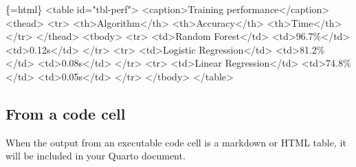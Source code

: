 \documentclass[
  letterpaper,
  DIV=11,
  numbers=noendperiod,
  oneside]{scrreprt}
\newenvironment{Shaded}{\begin{snugshade}}{\end{snugshade}}
\newcommand{\InformationTok}[1]{\textcolor[rgb]{0.37,0.37,0.37}{#1}}
\begin{document}
\begin{tcolorbox}
\begin{Shaded}
\begin{Highlighting}[]
\InformationTok{\textasciigrave{}\textasciigrave{}\textasciigrave{}\{=html\}}
\InformationTok{\textless{}table id="tbl{-}perf"\textgreater{}}
\InformationTok{  \textless{}caption\textgreater{}Training performance\textless{}/caption\textgreater{}}
\InformationTok{  \textless{}thead\textgreater{}}
\InformationTok{    \textless{}tr\textgreater{}}
\InformationTok{      \textless{}th\textgreater{}Algorithm\textless{}/th\textgreater{}}
\InformationTok{      \textless{}th\textgreater{}Accuracy\textless{}/th\textgreater{}}
\InformationTok{      \textless{}th\textgreater{}Time\textless{}/th\textgreater{}}
\InformationTok{    \textless{}/tr\textgreater{}}
\InformationTok{  \textless{}/thead\textgreater{}}
\InformationTok{  \textless{}tbody\textgreater{}}
\InformationTok{    \textless{}tr\textgreater{}}
\InformationTok{      \textless{}td\textgreater{}Random Forest\textless{}/td\textgreater{}}
\InformationTok{      \textless{}td\textgreater{}96.7\%\textless{}/td\textgreater{}}
\InformationTok{      \textless{}td\textgreater{}0.12s\textless{}/td\textgreater{}}
\InformationTok{    \textless{}/tr\textgreater{}}
\InformationTok{    \textless{}tr\textgreater{}}
\InformationTok{      \textless{}td\textgreater{}Logistic Regression\textless{}/td\textgreater{}}
\InformationTok{      \textless{}td\textgreater{}81.2\%\textless{}/td\textgreater{}}
\InformationTok{      \textless{}td\textgreater{}0.08s\textless{}/td\textgreater{}}
\InformationTok{    \textless{}/tr\textgreater{}}
\InformationTok{    \textless{}tr\textgreater{}}
\InformationTok{      \textless{}td\textgreater{}Linear Regression\textless{}/td\textgreater{}}
\InformationTok{      \textless{}td\textgreater{}74.8\%\textless{}/td\textgreater{}}
\InformationTok{      \textless{}td\textgreater{}0.05s\textless{}/td\textgreater{}}
\InformationTok{    \textless{}/tr\textgreater{}}
\InformationTok{  \textless{}/tbody\textgreater{}}
\InformationTok{\textless{}/table\textgreater{}}
\InformationTok{\textasciigrave{}\textasciigrave{}\textasciigrave{}}
\end{Highlighting}
\end{Shaded}

\subsection{From a code cell}\label{sec-computational-table}

When the output from an executable code cell is a markdown or HTML
table, it will be included in your Quarto document.


\end{tcolorbox}
\end{document}

